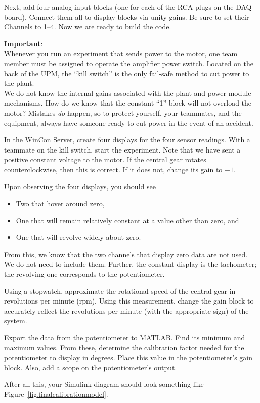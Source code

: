 Next, add four analog input blocks (one for each of the RCA plugs on the DAQ board).  Connect them all to display blocks via unity gains.  Be sure to set their Channels to 1--4.  Now we are ready to build the code.
\par
\noindent\parbox{\textwidth}{
\mbox{\Large \textbf{Important}:}\\[3pt]
\indent \large Whenever you run an experiment that sends power to the motor, one team member must be assigned to operate the amplifier power switch.  Located on the back of the UPM, the ``kill switch'' is the only fail-safe method to cut power to the plant.\\[3pt]
\indent We do not know the internal gains associated with the plant and power module mechanisms.  How do we know that the constant ``1'' block will not overload the motor?  Mistakes \textit{do} happen, so to protect yourself, your teammates, and the equipment, always have someone ready to cut power in the event of an accident.
}

\vspace{6pt}

\par
In the WinCon Server, create four displays for the four sensor readings.  With a teammate on the kill switch, start the experiment.  Note that we have sent a positive constant voltage to the motor.  If the central gear rotates counterclockwise, then this is correct.  If it does not, change its gain to $-1$.
\par
Upon observing the four displays, you should see
\begin{itemize}
\item
    Two that hover around zero,
\item
    One that will remain relatively constant at a value other than zero, and
\item
    One that will revolve widely about zero.
\end{itemize}
From this, we know that the two channels that display zero data are not used.  We do not need to include them.  Further, the constant display is the tachometer; the revolving one corresponds to the potentiometer.
\par
Using a stopwatch, approximate the rotational speed of the central gear in revolutions per minute (rpm).  Using this measurement, change the gain block to accurately reflect the revolutions per minute (with the appropriate sign) of the system.
\par
Export the data from the potentiometer to MATLAB.  Find its minimum and maximum values.  From these, determine the calibration factor needed for the potentiometer to display in degrees.  Place this value in the potentiometer's gain block.  Also, add a scope on the potentiometer's output.
\par
After all this, your Simulink diagram should look something like Figure~\ref{fig.finalcalibrationmodel}.

